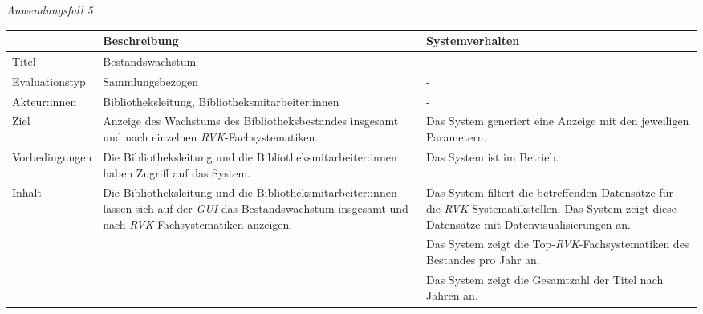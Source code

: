 \endgroup


\newpage
\noindent
\textit{Anwendungsfall 5}

\begingroup
\setlength{\tabcolsep}{10pt} %
\renewcommand{\arraystretch}{1.25} 
\begin{table}[h]
    \centering
    \begin{adjustbox}{max width=\textwidth}
    \begin{tabular}{lp{7.0cm}p{7.0cm}}
       \toprule
       \textbf{}          & \textbf{Beschreibung} &\textbf{Systemverhalten}\\
       \midrule
        Titel                            &Bestandswachstum& -\\
        Evaluationstyp                   &Sammlungsbezogen                   & -\\
        Akteur:innen                     &Bibliotheksleitung, Bibliotheksmitarbeiter:innen& -\\
        Ziel                             &Anzeige des Wachstums des Bibliotheksbestandes insgesamt und nach einzelnen \textit{\acrshort{RVK}}-Fachsystematiken.& Das System generiert eine Anzeige mit den jeweiligen Parametern.\\
        Vorbedingungen                   &Die Bibliotheksleitung und die Bibliotheksmitarbeiter:innen haben Zugriff auf das System.& Das System ist im Betrieb.\\
        Inhalt                           &Die Bibliotheksleitung und die Bibliotheksmitarbeiter:innen lassen sich auf der \textit{\acrshort{GUI}} das Bestandswachstum insgesamt und nach \textit{\acrshort{RVK}}-Fachsystematiken anzeigen.& Das System filtert die betreffenden Datensätze für die  \textit{\acrshort{RVK}}-Systematikstellen. Das System zeigt diese Datensätze mit Datenvisualisierungen an.\\
                                         & &Das System zeigt die Top-\textit{\acrshort{RVK}}-Fachsystematiken des Bestandes pro Jahr an.\\
                                         & &Das System zeigt die Gesamtzahl der Titel nach Jahren an.\\

\end{tabular}
\end{adjustbox}
\end{table}

